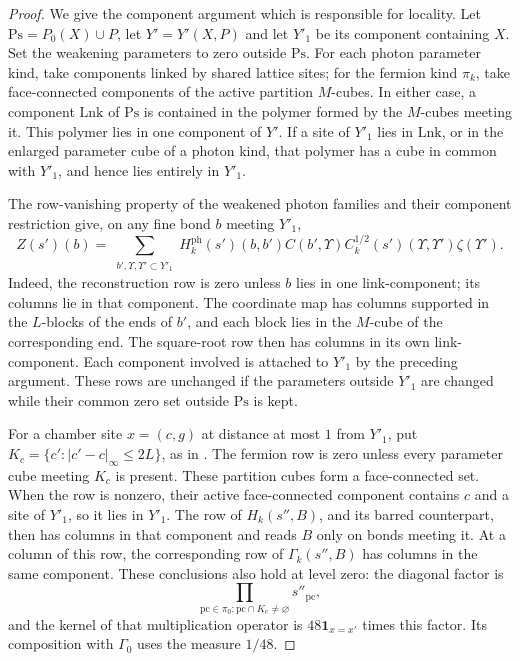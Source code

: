 \begin{proof}
We give the component argument which is responsible for
locality. Let $\mathrm{Ps}=P_0(X)\cup P$, let
$Y'=Y'(X,P)$ and let $Y'_1$ be its component containing $X$.
Set the weakening parameters to zero outside $\mathrm{Ps}$.
For each photon parameter kind, take components linked by shared
lattice sites; for the fermion kind $\pi_k$, take face-connected
components of the active partition $M$-cubes. In either case,
a component $\mathrm{Lnk}$ of $\mathrm{Ps}$ is contained in the
polymer formed by the $M$-cubes meeting it. This polymer lies in one
component of $Y'$. If a site of $Y'_1$ lies in $\mathrm{Lnk}$,
or in the enlarged parameter cube of a photon kind, that
polymer has a cube in common with $Y'_1$, and hence lies
entirely in $Y'_1$.

The row-vanishing property of the weakened photon families
and their component restriction give, on any fine bond $b$
meeting $Y'_1$,
\begin{equation}\label{eq:rgnl-restricted-photon}
 Z(s')(b)=
  \sum_{\substack{b',\Upsilon,\Upsilon'\subset Y'_1}}
   H_k^{\mathrm{ph}}(s')(b,b')C(b',\Upsilon)
          C_k^{1/2}(s')(\Upsilon,\Upsilon')\zeta(\Upsilon').
\end{equation}
Indeed, the reconstruction row is zero unless $b$ lies in
one link-component; its columns lie in that component.
The coordinate map has columns supported in the $L$-blocks
of the ends of $b'$, and each block lies in the $M$-cube of
the corresponding end. The square-root row then has columns
in its own link-component. Each component involved is
attached to $Y'_1$ by the preceding argument.
These rows are unchanged if the parameters outside $Y'_1$
are changed while their common zero set outside $\mathrm{Ps}$
is kept.

For a chamber site $x=(c,g)$ at distance at most $1$ from
$Y'_1$, put $K_c=\{c':|c'-c|_\infty\le2L\}$, as in
\cite[Proposition~4.1]{FermionBlockManuscript}.
The fermion row is zero unless every parameter cube
meeting $K_c$ is present. These partition cubes form a
face-connected set. When the row is nonzero, their active
face-connected component contains $c$ and a site of $Y'_1$,
so it lies in $Y'_1$.
The row of $H_k(s'',B)$, and its barred counterpart,
then has columns in that component and reads $B$ only on
bonds meeting it. At a column of this row, the corresponding
row of $\Gamma_k(s'',B)$ has columns in the same component.
These conclusions also hold at level zero: the diagonal
factor is
\[
 \prod_{\mathrm{pc}\in\pi_0:\mathrm{pc}\cap K_c\ne\varnothing}
                                                       s''_{\mathrm{pc}},
\]
and the kernel of that multiplication operator is
$48\mathbf1_{x=x'}$ times this factor. Its composition with
$\Gamma_0$ uses the measure $1/48$.


\end{proof}
